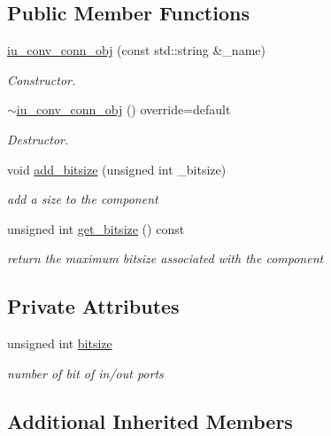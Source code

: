 \subsection*{Public Member Functions}
\begin{DoxyCompactItemize}
\item 
\hyperlink{classiu__conv__conn__obj_a29880639aabd922754831c322c479f56}{iu\+\_\+conv\+\_\+conn\+\_\+obj} (const std\+::string \&\+\_\+name)
\begin{DoxyCompactList}\small\item\em Constructor. \end{DoxyCompactList}\item 
\hyperlink{classiu__conv__conn__obj_a59949dfafabe80989259250255f5a8ed}{$\sim$iu\+\_\+conv\+\_\+conn\+\_\+obj} () override=default
\begin{DoxyCompactList}\small\item\em Destructor. \end{DoxyCompactList}\item 
void \hyperlink{classiu__conv__conn__obj_a002f631510ac7c0dbb6950ce5af7bf96}{add\+\_\+bitsize} (unsigned int \+\_\+bitsize)
\begin{DoxyCompactList}\small\item\em add a size to the component \end{DoxyCompactList}\item 
unsigned int \hyperlink{classiu__conv__conn__obj_a62a6e27dd2ce0b9e085b10a4bc76de4a}{get\+\_\+bitsize} () const
\begin{DoxyCompactList}\small\item\em return the maximum bitsize associated with the component \end{DoxyCompactList}\end{DoxyCompactItemize}
\subsection*{Private Attributes}
\begin{DoxyCompactItemize}
\item 
unsigned int \hyperlink{classiu__conv__conn__obj_a973b7dc9eda0ede85d11f2ac18315aea}{bitsize}
\begin{DoxyCompactList}\small\item\em number of bit of in/out ports \end{DoxyCompactList}\end{DoxyCompactItemize}
\subsection*{Additional Inherited Members}


